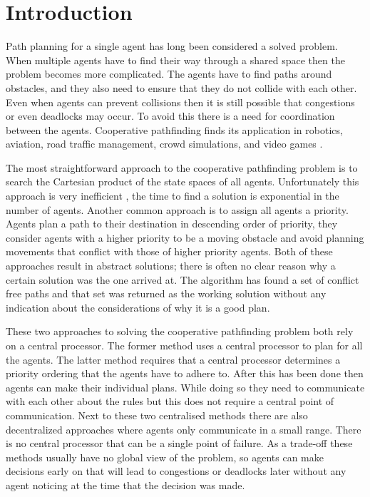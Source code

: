 \section{Introduction}\label{sec:intro}
Path planning for a single agent has long been considered a solved problem.
When multiple agents have to find their way through a shared space then the
problem becomes more complicated. The agents have to find paths around
obstacles, and they also need to ensure that they do not collide with each
other. Even when agents can prevent collisions then it is still possible that
congestions or even deadlocks may occur. To avoid this there is a need for
coordination between the agents. Cooperative pathfinding finds its application
in robotics, aviation, road traffic management, crowd simulations, and video
games \cite{standley2011}.

The most straightforward approach to the cooperative pathfinding problem is to
search the Cartesian product of the state spaces of all agents. Unfortunately
this approach is very inefficient \cite{sharon2013}, the time to find a
solution is exponential in the number of agents. Another common approach is to
assign all agents a priority. Agents plan a path to their destination in
descending order of priority, they consider agents with a higher priority to be
a moving obstacle and avoid planning movements that conflict with those of
higher priority agents. Both of these approaches result in abstract solutions;
there is often no clear reason why a certain solution
was the one arrived at. The algorithm has found a set of conflict free paths
and that set was returned as the working solution without any indication about
the considerations of why it is a good plan.

These two approaches to solving the cooperative pathfinding problem both rely
on a central processor. The former method uses a central processor to plan for
all the agents. The latter method requires that a central processor determines
a priority ordering that the agents have to adhere to. After this has been done
then agents can make their individual plans. While doing so they need to
communicate with each other about the rules but this does not require a central
point of communication. Next to these two centralised methods there are also
decentralized approaches where agents only communicate in a small range. There
is no central processor that can be a single point of failure. As a trade-off
these methods usually have no global view of the problem, so agents can make
decisions early on that will lead to congestions or deadlocks later without any
agent noticing at the time that the decision was made.

